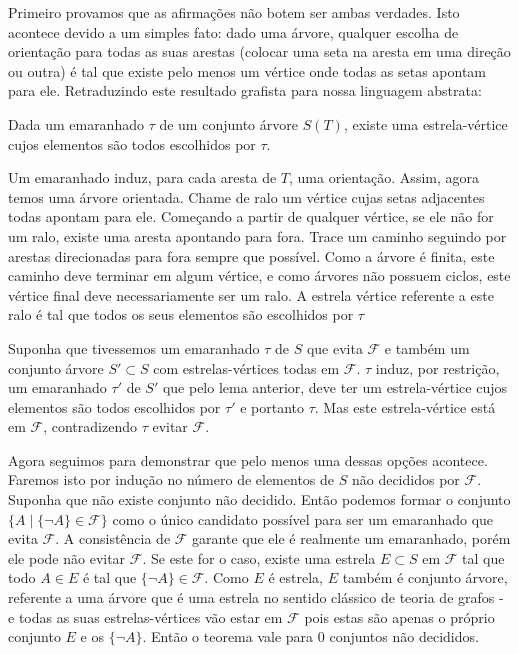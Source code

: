   \begin{prova}
    Primeiro provamos que as afirmações não botem ser ambas verdades. Isto acontece devido a um simples fato: dado uma árvore, qualquer escolha de orientação para todas as suas arestas (colocar uma seta na aresta em uma direção ou outra) é tal que existe pelo menos um vértice onde todas as setas apontam para ele. Retraduzindo este resultado grafista para nossa linguagem abstrata:

    \begin{lema*}
      Dada um emaranhado $\tau$ de um conjunto árvore $S(T)$, existe uma estrela-vértice cujos elementos são todos escolhidos por $\tau$.
    \end{lema*}
    \begin{prova}
      Um emaranhado induz, para cada aresta de $T$, uma orientação. Assim, agora temos uma árvore orientada. Chame de ralo um vértice cujas setas adjacentes todas apontam para ele. Começando a partir de qualquer vértice, se ele não for um ralo, existe uma aresta apontando para fora. Trace um caminho seguindo por arestas direcionadas para fora sempre que possível. Como a árvore é finita, este caminho deve terminar em algum vértice, e como árvores não possuem ciclos, este vértice final deve necessariamente ser um ralo. A estrela vértice referente a este ralo é tal que todos os seus elementos são escolhidos por $\tau$
    \end{prova}

    Suponha que tivessemos um emaranhado  $\tau$ de $S$ que evita $\mathcal{F}$ e também um conjunto árvore $S' \subset S$ com estrelas-vértices todas em $\mathcal{F}$. $\tau$ induz, por restrição, um emaranhado $\tau'$ de $S'$ que pelo lema anterior, deve ter um estrela-vértice cujos elementos são todos escolhidos por $\tau'$ e portanto $\tau$. Mas este estrela-vértice está em $\mathcal{F}$, contradizendo $\tau$ evitar $\mathcal{F}$.

    Agora seguimos para demonstrar que pelo menos uma dessas opções acontece. Faremos isto por indução no número de elementos de $S$ não decididos por $\mathcal{F}$. Suponha que não existe conjunto não decidido. Então podemos formar o conjunto $\{A \mid \{\lnot A\} \in \mathcal{F}\}$ como o único candidato possível para ser um emaranhado que evita $\mathcal{F}$. A consistência de $\mathcal{F}$ garante que ele é realmente um emaranhado, porém ele pode não evitar $\mathcal{F}$. Se este for o caso, existe uma estrela $E \subset S$ em $\mathcal{F}$ tal que todo $A \in E$ é tal que $\{\lnot A\} \in \mathcal{F}$. Como $E$ é estrela, $E$ também é conjunto árvore, referente a uma árvore que é uma estrela no sentido clássico de teoria de grafos - e todas as suas estrelas-vértices vão estar em $\mathcal{F}$ pois estas são apenas o próprio conjunto $E$ e os $\{\lnot A\}$. Então o teorema vale para $0$ conjuntos não decididos.
    

\end{prova}
